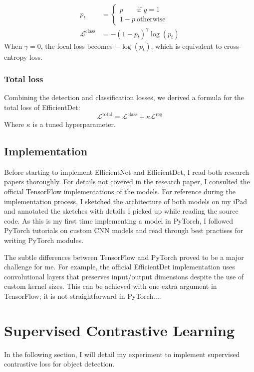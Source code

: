 \documentclass[12pt,a4paper,twoside,openright]{report}
\newcommand{\clsloss}{\mathcal{L}^\text{class}}
\newcommand{\regloss}{\mathcal{L}^\text{reg}}
\begin{document}
\begin{align}\label{eq:focal}
p_t&=\begin{cases}
    p\quad\quad\text{if }y=1\\
    1-p\ \text{otherwise}
    \end{cases}\\
\clsloss &= -(1-p_t)^\gamma \log(p_t)
\end{align}
When $\gamma=0$, the focal loss becomes $-\log(p_t)$, which is equivalent to cross-entropy loss.

\subsubsection{Total loss}
Combining the detection and classification losses, we derived a formula for the total loss of EfficientDet:
$$
\mathcal{L}^{\text{total}} = \clsloss + \kappa\regloss
$$
 Where $\kappa$ is a tuned hyperparameter. 

\subsection{Implementation}
Before starting to implement EfficientNet and EfficientDet, I read both research papers thoroughly. For details not covered in the research paper, I consulted the official TensorFlow implementations of the models. For reference during the implementation process, I sketched the architecture of both models on my iPad and annotated the sketches with details I picked up while reading the source code. As this is my first time implementing a model in PyTorch, I followed PyTorch tutorials on custom CNN models and read through best practises for writing PyTorch modules.

The subtle differences between TensorFlow and PyTorch proved to be a major challenge for me. For example, the official EfficientDet implementation uses convolutional layers that preserves input/output dimensions despite the use of custom kernel sizes. This can be achieved with one extra argument in TensorFlow; it is not straightforward in PyTorch....

\section{Supervised Contrastive Learning}
In the following section, I will detail my experiment to implement supervised contrastive loss \cite{khosla_supervised_2021} for object detection.
\end{document}
